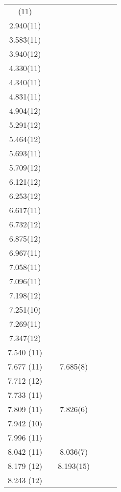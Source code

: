 \begin{center}
\begin{longtable}{cc cc cc}
\endlastfoot
 1.810(11)  &   &   &   &   &   \\
2.940(11)   &   &   &   &   &   \\
3.583(11)   &   &   &   &   &   \\
3.940(12)   &   &   &   &   &   \\
4.330(11)   &   &   &   &   &   \\
4.340(11)   &   &   &   &   &   \\
4.831(11)   &   &   &   &   &   \\
4.904(12)   &   &   &   &   &   \\
5.291(12)   &   &   &   &   &   \\
5.464(12)   &   &   &   &   &   \\
5.693(11)   &   &   &   &   &   \\
5.709(12)   &   &   &   &   &   \\
6.121(12)   &   &   &   &   &   \\
6.253(12)   &   &   &   &   &   \\
6.617(11)   &   &   &   &   &   \\
6.732(12)   &   &   &   &   &   \\
6.875(12)   &   &   &   &   &   \\
6.967(11)   &   &   &   &   &   \\
7.058(11)   &   &   &   &   &   \\
7.096(11)   &   &   &   &   &   \\
7.198(12)   &   &   &   &   &   \\
7.251(10)   &   &   &   &   &   \\
7.269(11)   &   &   &   &   &   \\
7.347(12)   &   &   &   &   &   \\
  7.540 (11)    &   &   &   &   &   \\
  7.677 (11)    &   &  7.685(8)   &   &   &   \\
  7.712 (12)    &   &   &   &   &   \\
  7.733 (11)    &   &   &   &   &   \\
  7.809 (11)    &   &  7.826(6)   &   &   &   \\
  7.942 (10)    &   &   &   &   &   \\
  7.996 (11)    &   &   &   &   &   \\
  8.042 (11)    &   &  8.036(7)   &   &   &   \\
  8.179 (12)    &   &  8.193(15)  &   &   &   \\
  8.243 (12)    &   &   &   &   &   \\

\end{longtable}
\end{center}

